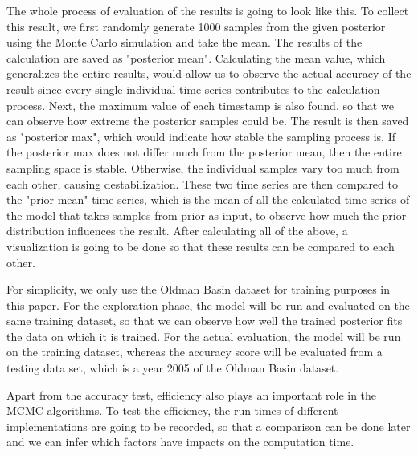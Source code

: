 The whole process of evaluation of the results is going to look like this. 
To collect this result, we first randomly generate 1000 samples from the given posterior using the Monte Carlo simulation \cite{monte_carlo_simulation} and take the mean. The results of the calculation are saved as "posterior mean". Calculating the mean value, which generalizes the entire results, would allow us to observe the actual accuracy of the result since every single individual time series contributes to the calculation process. Next, the maximum value of each timestamp is also found, so that we can observe how extreme the posterior samples could be. The result is then saved as "posterior max", which would indicate how stable the sampling process is. If the posterior max does not differ much from the posterior mean, then the entire sampling space is stable. Otherwise, the individual samples vary too much from each other, causing destabilization. These two time series are then compared to the "prior mean" time series, which is the mean of all the calculated time series of the model that takes samples from prior as input, to observe how much the prior distribution influences the result. After calculating all of the above, a visualization is going to be done so that these results can be compared to each other. 

For simplicity, we only use the Oldman Basin dataset for training purposes in this paper. For the exploration phase, the model will be run and evaluated on the same training dataset, so that we can observe how well the trained posterior fits the data on which it is trained. For the actual evaluation, the model will be run on the training dataset, whereas the accuracy score will be evaluated from a testing data set, which is a year 2005 of the Oldman Basin dataset.

Apart from the accuracy test, efficiency also plays an important role in the MCMC algorithms.\cite{MCMC_efficiency} To test the efficiency, the run times of different implementations are going to be recorded, so that a comparison can be done later and we can infer which factors have impacts on the computation time.

